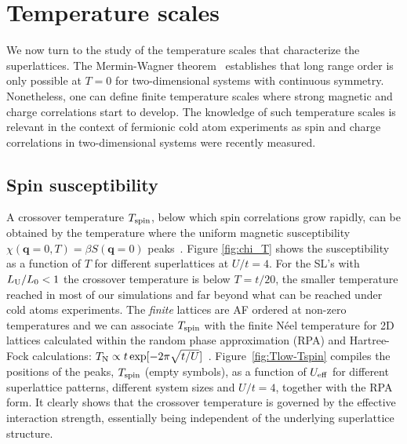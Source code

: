 \documentclass[aps,pra,reprint,twocolumn,showpacs,longbibliography,superscriptaddress]{revtex4-1}
\begin{document}

\section{Temperature scales}

We now turn to the study of the temperature scales that characterize the superlattices. The Mermin-Wagner theorem~\cite{merminwagner} establishes that long range order is only possible at $T=0$ for two-dimensional systems with continuous symmetry. Nonetheless, one can define finite temperature scales where strong magnetic and charge correlations start to develop.  The knowledge of such temperature scales is relevant in the context of fermionic cold atom experiments as spin and charge correlations in two-dimensional systems were recently measured. \cite{Cheuk1260,Parsons2016}

\label{sec:tdynprop}
\subsection{Spin susceptibility}
A crossover temperature $T_{\rm spin}$, below which spin correlations grow rapidly, can be obtained by the temperature where the uniform magnetic susceptibility $\chi(\textbf{q}=0,T)=\beta S(\textbf{q}=0)$ peaks~\cite{tspin}. Figure \ref{fig:chi_T} shows the susceptibility as a function of $T$ for different superlattices at $U/t=4$. For the SL's with $L_{\rm U}/L_0<1$ the crossover temperature is below $T=t/20$, the smaller temperature reached in most of our simulations and far beyond what can be reached under cold atoms experiments.  The \textit{finite} lattices are AF ordered at non-zero temperatures and we can associate $T_{\rm spin}$ with the finite N\'eel temperature for 2D lattices calculated within the random phase approximation (RPA) and Hartree-Fock calculations: $T_{\rm N} \propto t \exp[-2\pi \sqrt{t/U}]$~\cite{Hirsch85}. Figure~\ref{fig:Tlow-Tspin} compiles the positions of the peaks, $T_{\rm spin}$ (empty symbols), as a function of $U_{\rm eff}$ for different superlattice patterns, different system sizes and $U/t=4$, together with the RPA form. It clearly shows that the crossover temperature is governed by the effective interaction strength, essentially being independent of the underlying superlattice structure.
\end{document}
